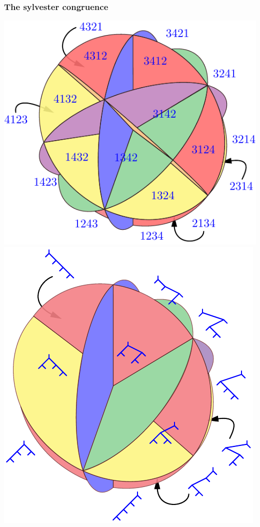 \documentclass[11pt]{beamer}%
\begin{document}
\begin{frame}
  \frametitle{The sylvester congruence}
    \begin{center}
      \includegraphics[height=.5\textheight]{braidFanLeft4.pdf}
      \includegraphics[height=.5\textheight]{sylvesterFan4.pdf}
    \end{center}
\end{frame}
\end{document}
